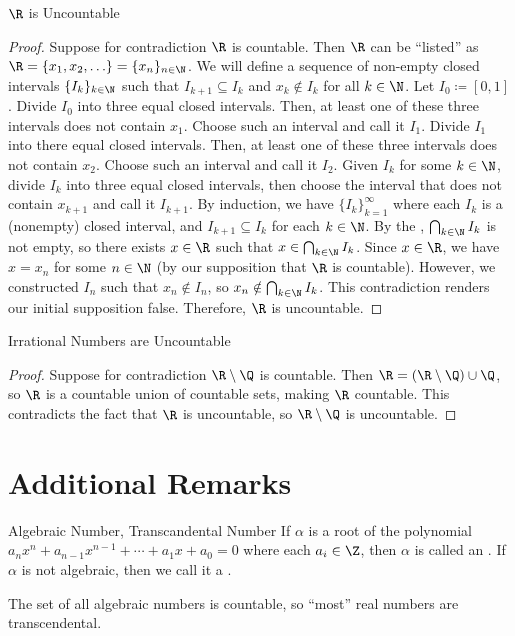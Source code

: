 \begin{thmbox}{$\R$ is Uncountable}{}
    \begin{proof}
        Suppose for contradiction $\R$ is countable. Then $\R$ can be ``listed'' as $\R = \{x_1, x_2, \ldots\} = \{x_n\}_{n \in \N}$. We will define a sequence of non-empty closed intervals $\{I_k\}_{k \in \N}$ such that $I_{k+1} \subseteq I_k$ and $x_k \notin I_k$ for all $k \in \N$. Let $I_0 \coloneq [0,1]$. Divide $I_0$ into three equal closed intervals. Then, at least one of these three intervals does not contain $x_1$. Choose such an interval and call it $I_1$. Divide $I_1$ into there equal closed intervals. Then, at least one of these three intervals does not contain $x_2$. Choose such an interval and call it $I_2$. Given $I_k$ for some $k \in \N$, divide $I_k$ into three equal closed intervals, then choose the interval that does not contain $x_{k+1}$ and call it $I_{k+1}$. By induction, we have $\{I_k\}_{k=1}^\infty$ where each $I_k$ is a (nonempty) closed interval, and $I_{k+1} \subseteq I_k$ for each $k \in \N$. By the , $\bigcap_{k \in \N} I_k$ is not empty, so there exists $x \in \R$ such that $x \in \bigcap_{k \in \N} I_k$. Since $x \in \R$, we have $x = x_n$ for some $n \in \N$ (by our supposition that $\R$ is countable). However, we constructed $I_n$ such that $x_n \notin I_n$, so $x_n \notin \bigcap_{k \in \N} I_k$. This contradiction renders our initial supposition false. Therefore, $\R$ is uncountable.
    \end{proof}
\end{thmbox}

\begin{thmbox}{Irrational Numbers are Uncountable}{}
    \begin{proof}
        Suppose for contradiction $\R \setminus \Q$ is countable. Then $\R = (\R \setminus \Q) \cup \Q$, so $\R$ is a countable union of countable sets, making $\R$ countable. This contradicts the fact that $\R$ is uncountable, so $\R \setminus \Q$ is uncountable.
    \end{proof}
\end{thmbox}

\section{Additional Remarks}

\begin{dfnbox}{Algebraic Number, Transcandental Number}{}
    If $\alpha$ is a root of the polynomial $a_nx^n + a_{n-1} x^{n-1} + \cdots + a_1 x + a_0 = 0$ where each $a_i \in \Z$, then $\alpha$ is called an . If $\alpha$ is not algebraic, then we call it a .
\end{dfnbox}
 The set of all algebraic numbers is countable, so ``most'' real numbers are transcendental.

